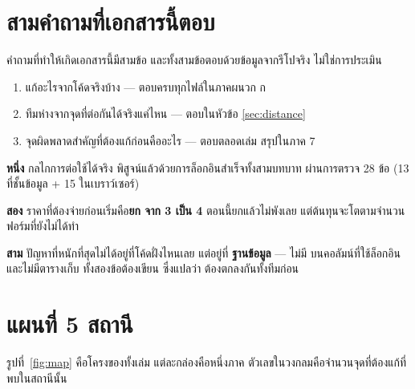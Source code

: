 \section{สามคำถามที่เอกสารนี้ตอบ}

คำถามที่ทำให้เกิดเอกสารนี้มีสามข้อ และทั้งสามข้อตอบด้วยข้อมูลจากรีโปจริง
ไม่ใช่การประเมิน

\begin{enumerate}
  \item {} แก้อะไรจากโค้ดจริงบ้าง --- ตอบครบทุกไฟล์ในภาคผนวก ก
  \item ทีมห่างจากจุดที่ต่อกันได้จริงแค่ไหน --- ตอบในหัวข้อ \ref{sec:distance}
  \item จุดผิดพลาดสำคัญที่ต้องแก้ก่อนคืออะไร --- ตอบตลอดเล่ม สรุปในภาค 7
\end{enumerate}

\begin{keybox}[title={ข้อสรุปสามบรรทัด ถ้าอ่านต่อไม่ไหว}]
\textbf{หนึ่ง} กลไกการต่อใช้ได้จริง พิสูจน์แล้วด้วยการล็อกอินสำเร็จทั้งสามบทบาท
ผ่านการตรวจ 28 ข้อ (13 ที่ชั้นข้อมูล + 15 ในเบราว์เซอร์)

\textbf{สอง} ราคาที่ต้องจ่ายก่อนเริ่มคือ\textbf{ยก  จาก 3 เป็น 4}
ตอนนี้ยกแล้วไม่พังเลย แต่ต้นทุนจะโตตามจำนวนฟอร์มที่ยังไม่ได้ทำ

\textbf{สาม} ปัญหาที่หนักที่สุดไม่ได้อยู่ที่โค้ดฝั่งไหนเลย แต่อยู่ที่
\textbf{ฐานข้อมูล} --- ไม่มี  บนคอลัมน์ที่ใช้ล็อกอิน
และไม่มีตารางเก็บ  ทั้งสองข้อต้องเขียน  ซึ่งแปลว่า
ต้องตกลงกันทั้งทีมก่อน
\end{keybox}

\section{แผนที่ 5 สถานี}

รูปที่~\ref{fig:map} คือโครงของทั้งเล่ม แต่ละกล่องคือหนึ่งภาค
ตัวเลขในวงกลมคือจำนวนจุดที่ต้องแก้ที่พบในสถานีนั้น

